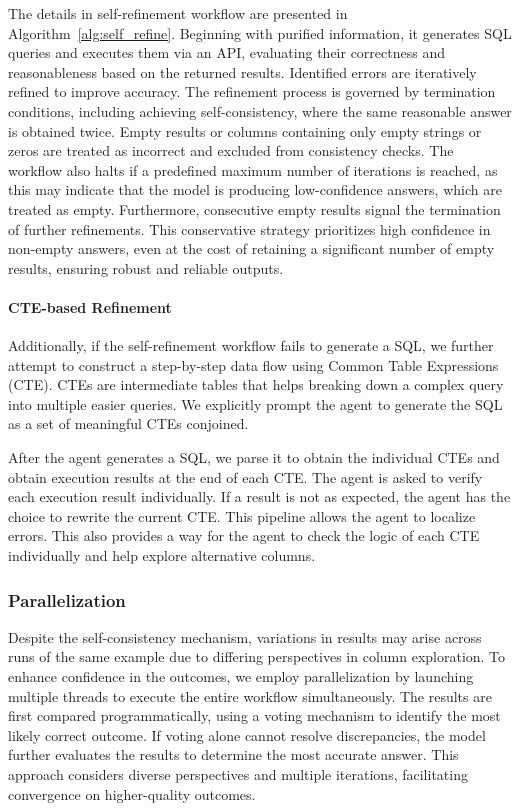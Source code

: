  The details in self-refinement workflow are presented in Algorithm~\ref{alg:self_refine}. Beginning with purified information, it generates SQL queries and executes them via an API, evaluating their correctness and reasonableness based on the returned results. Identified errors are iteratively refined to improve accuracy. The refinement process is governed by termination conditions, including achieving self-consistency, where the same reasonable answer is obtained twice. Empty results or columns containing only empty strings or zeros are treated as incorrect and excluded from consistency checks. The workflow also halts if a predefined maximum number of iterations is reached, as this may indicate that the model is producing low-confidence answers, which are treated as empty. Furthermore, consecutive empty results signal the termination of further refinements. This conservative strategy prioritizes high confidence in non-empty answers, even at the cost of retaining a significant number of empty results, ensuring robust and reliable outputs.

\paragraph{CTE-based Refinement} Additionally, if the self-refinement workflow fails to generate a SQL, we further attempt to construct a step-by-step data flow using Common Table Expressions (CTE). CTEs are intermediate tables that helps breaking down a complex query into multiple easier queries. We explicitly prompt the agent to generate the SQL as a set of meaningful CTEs conjoined. 

After the agent generates a SQL, we parse it to obtain the individual CTEs and obtain execution results at the end of each CTE. The agent is asked to verify each execution result individually.
If a result is not as expected, the agent has the choice to rewrite the current CTE. This pipeline allows the agent to localize errors. This also provides a way for the agent to check the logic of each CTE individually and help explore alternative columns.

\subsubsection{Parallelization}
    Despite the self-consistency mechanism, variations in results may arise across runs of the same example due to differing perspectives in column exploration. To enhance confidence in the outcomes, we employ parallelization by launching multiple threads to execute the entire workflow simultaneously. The results are first compared programmatically, using a voting mechanism to identify the most likely correct outcome. If voting alone cannot resolve discrepancies, the model further evaluates the results to determine the most accurate answer. This approach considers diverse perspectives and multiple iterations, facilitating convergence on higher-quality outcomes.

